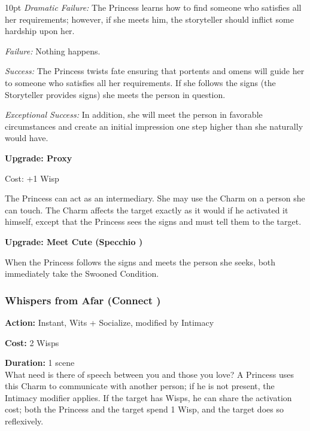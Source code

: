 \begin{myindentpar}{10pt}
    \emph{Dramatic Failure:} The Princess learns how to find someone who satisfies all her requirements; however, if she meets him, the storyteller should inflict some hardship upon her.
    
    \emph{Failure:} Nothing happens. 
    
    \emph{Success:} The Princess twists fate ensuring that portents and omens will guide her to someone who satisfies all her requirements. If she follows the signs (the Storyteller provides signs) she meets the person in question.
    
    \emph{Exceptional Success:} In addition, she will meet the person in favorable circumstances and create an initial impression one step higher than she naturally would have.
    
    \textbf{Upgrade: Proxy}
    
    Cost: +1 Wisp 
    
    The Princess can act as an intermediary. She may use the Charm on a person she can touch. The Charm affects the target exactly as it would if he activated it himself, except that the Princess sees the signs and must tell them to the target.    
	
	\textbf{Upgrade: Meet Cute (Specchio \textbullet\textbullet\textbullet)}
	
	When the Princess follows the signs and meets the person she seeks, both immediately take the Swooned Condition. 
	
\end{myindentpar}

\subsubsection*{Whispers from Afar (Connect \textbullet\textbullet\textbullet)}

\noindent \textbf{Action:} Instant, Wits + Socialize, modified by Intimacy

\noindent \textbf{Cost:} 2 Wisps

\noindent \textbf{Duration:} 1 scene \\

\noindent What need is there of speech between you and those you love? A Princess uses this Charm to communicate with another person; if he is not present, the Intimacy modifier applies. If the target has Wisps, he can share the activation cost; both the Princess and the target spend 1 Wisp, and the target does so reflexively. \\


